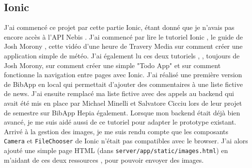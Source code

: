 \documentclass[a4paper, 12pt]{article}
\begin{document}
\subsection{Ionic}
J'ai commencé ce projet par cette partie Ionic, étant donné que je n'avais pas encore accès à l'API Nebis \cite{ref80}. 
J'ai commencé par lire le tutoriel Ionic \cite{ref0}, le guide de Josh Morony \cite{ref10}, cette vidéo d'une heure 
de Travery Media \cite{ref18} sur comment créer une application simple de météo. J'ai également lu ces deux tutoriels 
\cite{ref40}, \cite{ref50}, toujours de Josh Morony, sur comment créer une simple "Todo App" et sur comment fonctionne 
la navigation entre pages avec Ionic. J'ai réalisé une première version de BibApp en local qui permettait d'ajouter 
des commentaires à une liste fictive de news. J'ai ensuite remplacé ma liste fictive avec des appels au backend qui 
avait été mis en place par Michael Minelli et Salvatore Cicciu lors de leur projet de semestre sur BibApp Hepia 
également. Lorsque mon backend était déjà bien avancé, je me suis aidé aussi de ce tutoriel \cite{ref90} pour adapter 
le prototype existant. Arrivé à la gestion des images, je me suis rendu compte que les composants \texttt{Camera}
et \texttt{FileChooser} de Ionic n'était pas compatibles avec le browser. J'ai alors ajouté une simple page 
HTML (dans \texttt{server/app/static/images.html}) en m'aidant de ces deux ressources \cite{ref140}, \cite{ref150} 
pour pouvoir envoyer des images.
\end{document}
